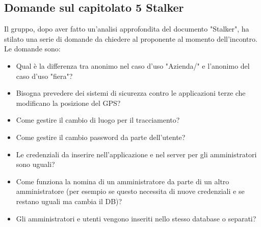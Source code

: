 \subsection{Domande sul capitolato 5 Stalker}
Il gruppo, dopo aver fatto un'analisi approfondita del documento "Stalker", ha stilato una serie di domande da chiedere al proponente al momento dell'incontro.
Le domande sono:
\begin{itemize}
	\item Qual è la differenza tra anonimo nel caso d’uso "Azienda/" e l’anonimo del caso d’uso "fiera"?
	\item Bisogna prevedere dei sistemi di sicurezza contro le applicazioni terze che modificano la posizione del GPS?
	\item Come gestire il cambio di luogo per il tracciamento?
	\item Come gestire il cambio password da parte dell’utente?
	\item Le credenziali da inserire nell’applicazione e nel server per gli amministratori sono uguali?
	\item Come funziona la nomina di un amministratore da parte di un altro amministratore (per esempio se questo necessita di nuove credenziali e se restano uguali ma cambia il DB)?
	\item Gli amministratori e utenti vengono inseriti nello stesso database o separati?
\end{itemize}



\clearpage
